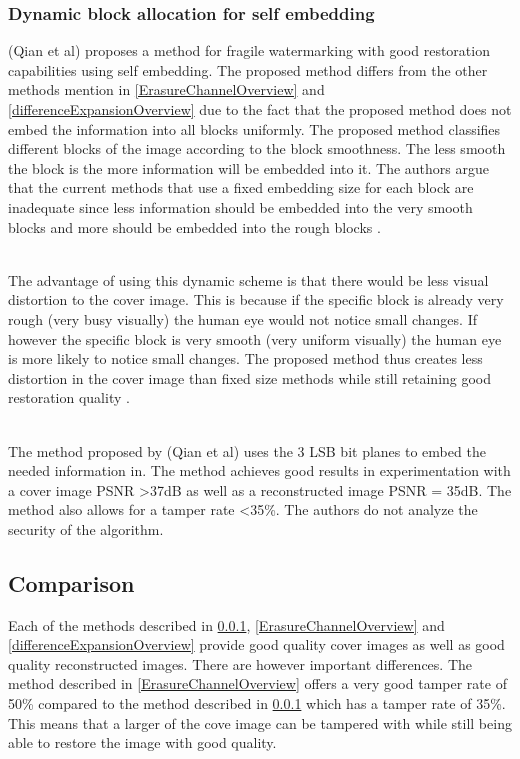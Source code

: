 \documentclass[11pt]{article}
\begin{document}
\subsubsection{Dynamic block allocation for self embedding}
\label{DynamicBlockOverview}
(Qian et al) \cite{qian2011image} proposes a method for fragile watermarking with good restoration capabilities using self embedding.
The proposed method differs from the other methods mention in \ref{ErasureChannelOverview} and \ref{differenceExpansionOverview} due to the fact that the proposed method does not embed the information into all blocks uniformly.
The proposed method classifies different blocks of the image according to the block smoothness.
The less smooth the block is the more information will be embedded into it.
The authors argue that the current methods that use a fixed embedding size for each block are inadequate since less information should be embedded into the very smooth blocks and more should be embedded into the rough blocks \cite{qian2011image}.

\hspace{0pt} \\
The advantage of using this dynamic scheme is that there would be less visual distortion to the cover image. 
This is because if the specific block is already very rough (very busy visually) the human eye would not notice small changes.
If however the specific block is very smooth (very uniform visually) the human eye is more likely to notice small changes.
The proposed method thus creates less distortion in the cover image than fixed size methods while still retaining good restoration quality \cite{qian2011image}. 

\hspace{0pt} \\
The method proposed by (Qian et al) \cite{qian2011image} uses the 3 LSB bit planes to embed the needed information in.
The method achieves good results in experimentation with a cover image PSNR \textgreater 37dB as well as a reconstructed image PSNR = 35dB.
The method also allows for a tamper rate \textless 35\%.
The authors do not analyze the security of the algorithm.

\subsection{Comparison}
Each of the methods described in \ref{DynamicBlockOverview}, \ref{ErasureChannelOverview} and \ref{differenceExpansionOverview} provide good quality cover images as well as good quality reconstructed images.
There are however important differences.
The method described in \ref{ErasureChannelOverview} offers a very good tamper rate of 50\% compared to the method described in \ref{DynamicBlockOverview} which has a tamper rate of 35\%.
This means that a larger of the cove image can be tampered with while still being able to restore the image with good quality.
\end{document}
